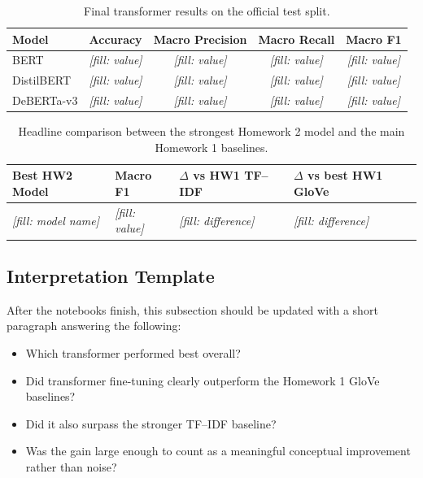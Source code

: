 \documentclass[12pt]{fphw}
\newcommand{\placeholder}[1]{\textit{[fill: #1]}}
\begin{document}
\begin{table}[h]
\centering
\small
\begin{tabularx}{\textwidth}{Xcccc}
\toprule
Model & Accuracy & Macro Precision & Macro Recall & Macro F1 \\
\midrule
BERT & \placeholder{value} & \placeholder{value} & \placeholder{value} & \placeholder{value} \\
DistilBERT & \placeholder{value} & \placeholder{value} & \placeholder{value} & \placeholder{value} \\
DeBERTa-v3 & \placeholder{value} & \placeholder{value} & \placeholder{value} & \placeholder{value} \\
\bottomrule
\end{tabularx}
\caption{Final transformer results on the official test split.}
\label{tab:hw2-results}
\end{table}

\begin{table}[h]
\centering
\begin{tabular}{llll}
\toprule
Best HW2 Model & Macro F1 & $\Delta$ vs HW1 TF--IDF & $\Delta$ vs best HW1 GloVe \\
\midrule
\placeholder{model name} & \placeholder{value} & \placeholder{difference} & \placeholder{difference} \\
\bottomrule
\end{tabular}
\caption{Headline comparison between the strongest Homework 2 model and the main Homework 1 baselines.}
\label{tab:headline-comparison}
\end{table}

\subsection{Interpretation Template}

After the notebooks finish, this subsection should be updated with a short paragraph answering the following:
\begin{itemize}
	\item Which transformer performed best overall?
	\item Did transformer fine-tuning clearly outperform the Homework 1 GloVe baselines?
	\item Did it also surpass the stronger TF--IDF baseline?
	\item Was the gain large enough to count as a meaningful conceptual improvement rather than noise?
\end{itemize}
\end{document}
